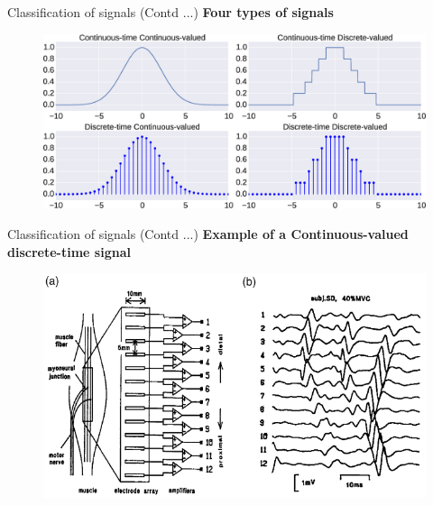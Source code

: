\documentclass{beamer}
\begin{document}
\begin{frame}{Classification of signals (Contd ...)}
\textbf{Four types of signals}
\begin{figure}
\includegraphics[width=\textwidth]{img/signal_types.eps}
\end{figure}
\end{frame}

\begin{frame}{Classification of signals (Contd ...)}
\textbf{Example of a Continuous-valued discrete-time signal}
\begin{figure}
\includegraphics[width=\textwidth]{img/emg_array.png}
\end{figure}
\end{frame}
\end{document}
